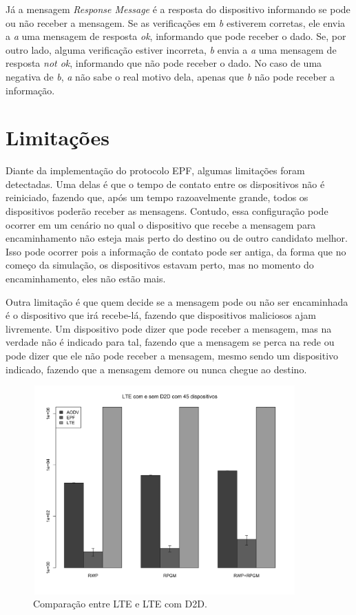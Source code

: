\documentclass[11pt,a4paper,titlepage]{article}
\begin{document}
Já a mensagem \textit{Response Message} é a resposta do dispositivo informando se pode ou não receber a mensagem.
Se as verificações em \textit{b} estiverem corretas, ele envia a \textit{a} uma mensagem de resposta \textit{ok}, informando que pode receber o dado.
Se, por outro lado, alguma verificação estiver incorreta, \textit{b} envia a \textit{a} uma mensagem de resposta \textit{not ok}, informando que não pode receber o dado.
No caso de uma negativa de \textit{b}, \textit{a} não sabe o real motivo dela, apenas que \textit{b} não pode receber a informação.

\section{Limitações}\label{sec:limit}

Diante da implementação do protocolo EPF, algumas limitações foram detectadas.
Uma delas é que o tempo de contato entre os dispositivos não é reiniciado, fazendo que, após um tempo razoavelmente grande, todos os dispositivos poderão receber as mensagens.
Contudo, essa configuração pode ocorrer em um cenário no qual o dispositivo que recebe a mensagem para encaminhamento não esteja mais perto do destino ou de outro candidato melhor.
Isso pode ocorrer pois a informação de contato pode ser antiga, da forma que no começo da simulação, os dispositivos estavam perto, mas no momento do encaminhamento, eles não estão mais.

Outra limitação é que quem decide se a mensagem pode ou não ser encaminhada é o dispositivo que irá recebe-lá, fazendo que dispositivos maliciosos ajam livremente.
Um dispositivo pode dizer que pode receber a mensagem, mas na verdade não é indicado para tal, fazendo que a mensagem se perca na rede ou pode dizer que ele não pode receber a mensagem, mesmo sendo um dispositivo indicado, fazendo que a mensagem demore ou nunca chegue ao destino.

\begin{figure}[ht]
\centering
\includegraphics[height=8cm, width=0.9\textwidth]{images/complte.jpg}
\caption{Comparação entre LTE e LTE com D2D.}
\label{fig:lte}
\end{figure}
\end{document}
